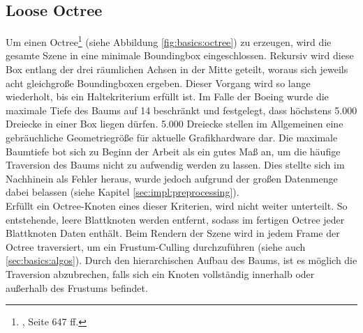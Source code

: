 \subsection{Loose Octree}
\label{sec:basics:octree}
Um einen Octree\footnote{\cite{RTR3}, Seite 647 ff.} (siehe Abbildung \ref{fig:basics:octree}) zu erzeugen, wird die gesamte Szene in eine minimale Boundingbox eingeschlossen. Rekursiv wird diese Box entlang der drei räumlichen Achsen in der Mitte geteilt, woraus sich jeweils acht gleichgroße Boundingboxen ergeben. Dieser Vorgang wird so lange wiederholt, bis ein Haltekriterium erfüllt ist. Im Falle der Boeing wurde die maximale Tiefe des Baums auf 14 beschränkt und festgelegt, dass höchstens 5.000 Dreiecke in einer Box liegen dürfen. 5.000 Dreiecke stellen im Allgemeinen eine gebräuchliche Geometriegröße für aktuelle Grafikhardware dar. Die maximale Baumtiefe bot sich zu Beginn der Arbeit als ein gutes Maß an, um die häufige Traversion des Baums nicht zu aufwendig werden zu lassen. Dies stellte sich im Nachhinein als Fehler heraus, wurde jedoch aufgrund der großen Datenmenge dabei belassen (siehe Kapitel \ref{sec:impl:preprocessing}).\\
Erfüllt ein Octree-Knoten eines dieser Kriterien, wird nicht weiter unterteilt. So entstehende, leere Blattknoten werden entfernt, sodass im fertigen Octree jeder Blattknoten Daten enthält. Beim Rendern der Szene wird in jedem Frame der Octree traversiert, um ein Frustum-Culling durchzuführen (siehe auch \ref{sec:basics:algos}). Durch den hierarchischen Aufbau des Baums, ist es möglich die Traversion abzubrechen, falls sich ein Knoten vollständig innerhalb oder außerhalb des Frustums befindet.

